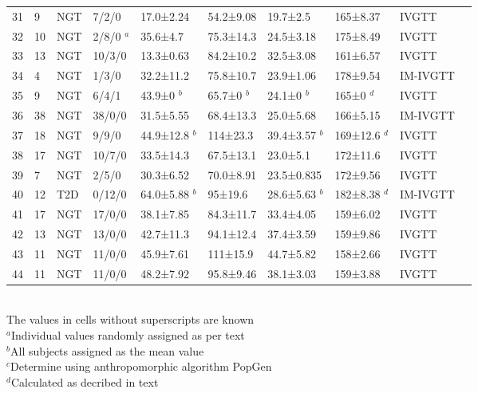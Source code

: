 \documentclass[utf8]{frontiersSCNS} %
\begin{document}
\begin{table}[h]
{\begin{tabular}{llllllllll}
31 & 9  & NGT & 7/2/0   & 17.0±2.24     & 54.2±9.08 & 19.7±2.5    & 165±8.37   & IVGTT   & \citet{pagano_1995}                      \\
32 & 10 & NGT & 2/8/0 $^a$ & 35.6±4.7    & 75.3±14.3 & 24.5±3.18   & 175±8.49   & IVGTT    & \citet{2001_MyocInfarct_Cavallo} \\
33 & 13 & NGT & 10/3/0  & 13.3±0.63   & 84.2±10.2 & 32.5±3.08   & 161±6.57   & IVGTT    & \citet{Cerutti1998}                      \\
34 & 4  & NGT & 1/3/0   & 32.2±11.2   & 75.8±10.7 & 23.9±1.06   & 178±9.54   & IM-IVGTT & \citet{2002_AGENESIS_Roden}      \\
35 & 9  & NGT & 6/4/1   & 43.9±0 $^b$    & 65.7±0 $^b$  & 24.1±0 $^b$    & 165±0 $^d$    & IVGTT & \citet{2008_hanisurya_thyroid} \\
36 & 38 & NGT & 38/0/0  & 31.5±5.55   & 68.4±13.3 & 25.0±5.68     & 166±5.15   & IM-IVGTT & \citet{2012_pGDM_tura}           \\
37 & 18 & NGT & 9/9/0   & 44.9±12.8 $^b$ & 114±23.3  & 39.4±3.57 $^b$ & 169±12.6 $^d$ & IVGTT    & \cite{Kautzky-Willer1992} \\
38 & 17 & NGT & 10/7/0  & 33.5±14.3   & 67.5±13.1 & 23.0±5.1      & 172±11.6   & IVGTT    & \citet{Kautzky-Willer1992}     \\
39 & 7  & NGT & 2/5/0   & 30.3±6.52   & 70.0±8.91   & 23.5±0.835  & 172±9.56   & IVGTT    & \citet{alex_1996}                     \\
40 & 12 & T2D & 0/12/0  & 64.0±5.88 $^b$   & 95±19.6   & 28.6±5.63 $^b$ & 182±8.38 $^d$ & IM-IVGTT & \citet{2010_alcohol_ludvik}      \\
41 & 17 & NGT & 17/0/0  & 38.1±7.85   & 84.3±11.7 & 33.4±4.05   & 159±6.02   & IVGTT     & \citet{2006_Davi_JACC}           \\
42 & 13 & NGT & 13/0/0  & 42.7±11.3   & 94.1±12.4 & 37.4±3.59   & 159±9.86   & IVGTT    & \citet{2006_Davi_JACC}           \\
43 & 11 & NGT & 11/0/0  & 45.9±7.61   & 111±15.9  & 44.7±5.82   & 158±2.66   & IVGTT    & \citet{2003_INFLAMMATORY_Davi}   \\
44 & 11 & NGT & 11/0/0  & 48.2±7.92   & 95.8±9.46 & 38.1±3.03   & 159±3.88   & IVGTT    & \citet{2003_INFLAMMATORY_Davi}  \\ \hline
\end{tabular}}
\\
The values in cells without superscripts are known \\ 
$^a$Individual values randomly assigned as per text\\
$^b$All subjects assigned as the mean value \\
$^c$Determine using anthropomorphic algorithm PopGen \\
$^d$Calculated as decribed in text \\
\end{table}
\end{document}
